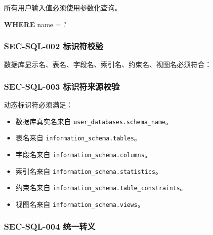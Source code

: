 \documentclass[
  a4paper,
  UTF8]{ctexart}
\newenvironment{Shaded}{}{}
\newcommand{\KeywordTok}[1]{\textcolor[rgb]{0.00,0.44,0.13}{\textbf{#1}}}
\newcommand{\NormalTok}[1]{#1}
\newcommand{\OperatorTok}[1]{\textcolor[rgb]{0.40,0.40,0.40}{#1}}
\providecommand{\tightlist}{%
  \setlength{\itemsep}{0pt}\setlength{\parskip}{0pt}}
\begin{document}
所有用户输入值必须使用参数化查询。

\begin{Shaded}
\begin{Highlighting}[]
\KeywordTok{WHERE}\NormalTok{ \textasciigrave{}name\textasciigrave{} }\OperatorTok{=}\NormalTok{ ?}
\end{Highlighting}
\end{Shaded}

\hypertarget{sec-sql-002-ux6807ux8bc6ux7b26ux6821ux9a8c}{%
\subsubsection{SEC-SQL-002
标识符校验}\label{sec-sql-002-ux6807ux8bc6ux7b26ux6821ux9a8c}}

数据库显示名、表名、字段名、索引名、约束名、视图名必须符合：

\begin{Shaded}
\end{Shaded}

\hypertarget{sec-sql-003-ux6807ux8bc6ux7b26ux6765ux6e90ux6821ux9a8c}{%
\subsubsection{SEC-SQL-003
标识符来源校验}\label{sec-sql-003-ux6807ux8bc6ux7b26ux6765ux6e90ux6821ux9a8c}}

动态标识符必须满足：

\begin{itemize}
\tightlist
\item
  数据库真实名来自 \texttt{user\_databases.schema\_name}。
\item
  表名来自 \texttt{information\_schema.tables}。
\item
  字段名来自 \texttt{information\_schema.columns}。
\item
  索引名来自 \texttt{information\_schema.statistics}。
\item
  约束名来自 \texttt{information\_schema.table\_constraints}。
\item
  视图名来自 \texttt{information\_schema.views}。
\end{itemize}

\hypertarget{sec-sql-004-ux7edfux4e00ux8f6cux4e49}{%
\subsubsection{SEC-SQL-004
统一转义}\label{sec-sql-004-ux7edfux4e00ux8f6cux4e49}}
\end{document}
